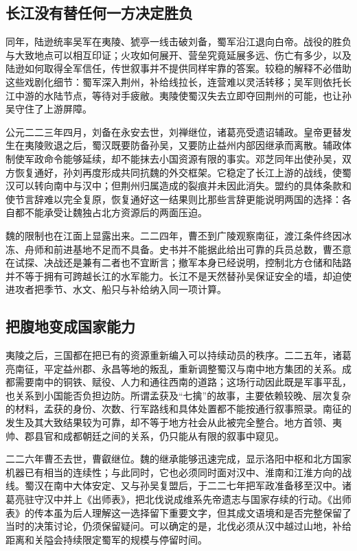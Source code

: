 \subsection{长江没有替任何一方决定胜负}

同年，陆逊统率吴军在夷陵、猇亭一线击破刘备，蜀军沿江退向白帝。战役的胜负与大致地点可以相互印证；火攻如何展开、营垒究竟延展多远、伤亡有多少，以及陆逊如何取得全军信任，传世叙事并不提供同样牢靠的答案。较稳的解释不必借助这些戏剧化细节：蜀军深入荆州，补给线拉长，连营难以灵活转移；吴军则依托长江中游的水陆节点，等待对手疲敝。夷陵使蜀汉失去立即夺回荆州的可能，也让孙吴守住了上游屏障。

公元二二三年四月，刘备在永安去世，刘禅继位，诸葛亮受遗诏辅政。皇帝更替发生在夷陵败退之后，蜀汉既要防备孙吴，又要防止益州内部因继承而离散。辅政体制使军政命令能够延续，却不能抹去小国资源有限的事实。邓芝同年出使孙吴，双方恢复通好，孙刘再度形成共同抗魏的外交框架。它稳定了长江上游的战线，使蜀汉可以转向南中与汉中；但荆州归属造成的裂痕并未因此消失。盟约的具体条款和使节言辞难以完全复原，恢复通好这一结果则比那些言辞更能说明两国的选择：各自都不能承受让魏独占北方资源后的两面压迫。

魏的限制也在江面上显露出来。二二四年，曹丕到广陵观察南征，渡江条件终因冰冻、舟师和前进基地不足而不具备。史书并不能据此给出可靠的兵员总数，曹丕意在试探、决战还是兼有二者也不宜断言；撤军本身已经说明，控制北方仓储和陆路并不等于拥有可跨越长江的水军能力。长江不是天然替孙吴保证安全的墙，却迫使进攻者把季节、水文、船只与补给纳入同一项计算。

\subsection{把腹地变成国家能力}

夷陵之后，三国都在把已有的资源重新编入可以持续动员的秩序。二二五年，诸葛亮南征，平定益州郡、永昌等地的叛乱，重新调整蜀汉与南中地方集团的关系。成都需要南中的铜铁、赋役、人力和通往西南的道路；这场行动因此既是军事平乱，也关系到小国能否负担边防。所谓孟获及“七擒”的故事，主要依赖较晚、层次复杂的材料，孟获的身份、次数、行军路线和具体处置都不能按通行叙事照录。南征的发生及其大致结果较为可靠，却不等于地方社会从此被完全整合。地方首领、夷帅、郡县官和成都朝廷之间的关系，仍只能从有限的叙事中窥见。

二二六年曹丕去世，曹叡继位。魏的继承能够迅速完成，显示洛阳中枢和北方国家机器已有相当的连续性；与此同时，它也必须同时面对汉中、淮南和江淮方向的战线。蜀汉在南中大体安定、又与孙吴复盟后，于二二七年把军政准备移至汉中。诸葛亮驻守汉中并上《出师表》，把北伐说成维系先帝遗志与国家存续的行动。《出师表》的传本虽为后人理解这一选择留下重要文字，但其成文语境和是否完整保留了当时的决策讨论，仍须保留疑问。可以确定的是，北伐必须从汉中越过山地，补给距离和关隘会持续限定蜀军的规模与停留时间。

